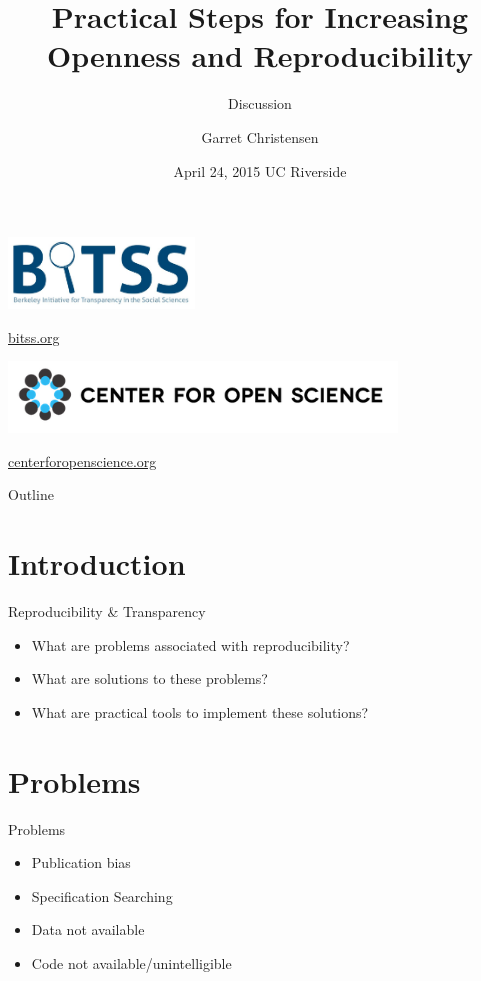 \documentclass{beamer}
\title[Short Paper Title] %
{Practical Steps for Increasing Openness and Reproducibility}
\subtitle
{Discussion} %
\author[Christensen] %
{Garret Christensen\inst{1}}
\institute[UC Berkeley, Berkely Initiatiative for Transparency in the Social Sciences] %
{
  \inst{1}%
  UC Berkeley: Berkely Initiatiative for Transparency in the Social Sciences\\
  Center for Open Science
}
\date[Short Occasion] %
{April 24, 2015 UC Riverside}
\begin{document}


\begin{frame}
  \titlepage
\end{frame}

\begin{frame}
\includegraphics[height=0.75in]{BITSSlogo.PNG}

 \url{bitss.org}
 
\includegraphics[height=0.75in]{COS.PNG}

\url{centerforopenscience.org}
\end{frame}

\begin{frame}{Outline}
  \tableofcontents
\end{frame}


\section{Introduction}
\begin{frame}{Reproducibility \& Transparency}
\begin{itemize}
\item What are problems associated with reproducibility?
\item What are solutions to these problems?
\item What are practical tools to implement these solutions?
\end{itemize}
\end{frame}
\section{Problems}
\begin{frame}{Problems}
 \begin{itemize}
 \item Publication bias
 \item Specification Searching
 \item Data not available
 \item Code not available/unintelligible
 \end{itemize}
\end{frame}
\end{document}
